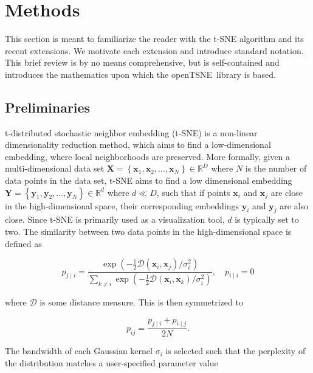 \documentclass[twocolumn]{bmcart}
\newcommand{\opentsne}{\textsf{openTSNE}}
\begin{document}
\section*{Methods}

This section is meant to familiarize the reader with the t-SNE algorithm and
its recent extensions. We motivate each extension and introduce standard notation.
This brief review is by no means comprehensive, but is
self-contained and introduces the mathematics upon which the \opentsne\ library
is based.

\subsection*{Preliminaries}

t-distributed stochastic neighbor embedding (t-SNE) is a non-linear
dimensionality reduction method, which aims to find a low-dimensional
embedding, where local neighborhoods are preserved. More formally, given a
multi-dimensional data set $\mathbf{X} = \left \{ \mathbf{x}_1, \mathbf{x}_2,
\dots, \mathbf{x}_N \right \} \in \mathbb{R}^D$ where $N$ is the number of data
points in the data set, t-SNE aims to find a low dimensional embedding
$\mathbf{Y} = \left \{ \mathbf{y}_1, \mathbf{y}_2, \dots, \mathbf{y}_N \right
\} \in \mathbb{R}^d$ where $d \ll D$, such that if points $\mathbf{x}_i$ and
$\mathbf{x}_j$ are close in the high-dimensional space, their corresponding
embeddings $\mathbf{y}_i$ and $\mathbf{y}_j$ are also close. Since t-SNE is
primarily used as a visualization tool, $d$ is typically set to two. The
similarity between two data points in the high-dimensional space is defined as

\begin{equation}
p_{j \mid i} = \frac{\exp \left ( -\frac{1}{2} \mathcal{D}(\mathbf{x}_i, \mathbf{x}_j ) / \sigma_i^2 \right )}
{\sum_{k \neq i } \exp \left ( -\frac{1}{2} \mathcal{D}(\mathbf{x}_i, \mathbf{x}_k ) / \sigma_i^2 \right )}, \quad p_{i \mid i} = 0
\label{eq:gaussian_kernel}
\end{equation}

\noindent where $\mathcal{D}$ is some distance measure. This is then
symmetrized to

\begin{equation}
p_{ij} = \frac{p_{j \mid i} + p_{i \mid j}}{2N}.
\label{eq:symmetrize}
\end{equation}

The bandwidth of each Gaussian kernel $\sigma_i$ is selected such that the
perplexity of the distribution matches a user-specified parameter value
\end{document}
